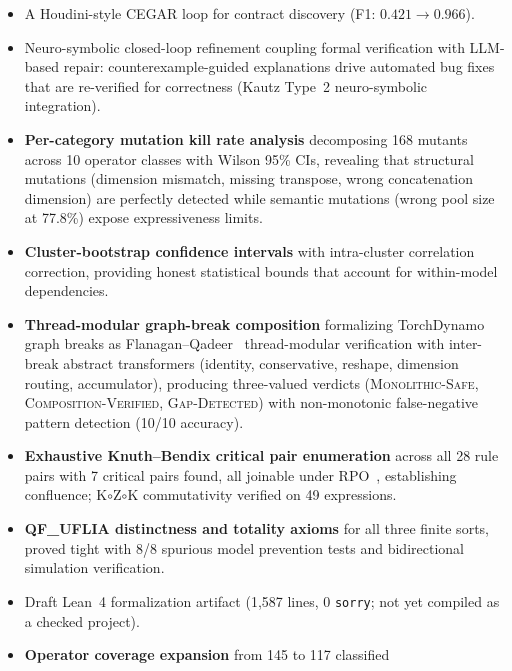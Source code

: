 \documentclass[11pt]{article}
\begin{document}
\begin{itemize}[leftmargin=2em]
    per-layer safety reasoning and counterexample traces, with
    CVC5 native Craig interpolation~\cite{tinelli03} guaranteeing
    all three Craig properties (implication, separation, vocabulary
    restriction) for predicate discovery.
  \item A Houdini-style CEGAR loop for contract discovery
    (F1: $0.421 \to 0.966$).
  \item Neuro-symbolic closed-loop refinement coupling formal
    verification with LLM-based repair: counterexample-guided
    explanations drive automated bug fixes that are re-verified
    for correctness (Kautz Type~2 neuro-symbolic integration).
  \item \textbf{Per-category mutation kill rate analysis} decomposing
    168 mutants across 10 operator classes with Wilson 95\% CIs,
    revealing that structural mutations (dimension mismatch, missing
    transpose, wrong concatenation dimension) are perfectly detected while semantic mutations
    (wrong pool size at 77.8\%) expose expressiveness limits.
  \item \textbf{Cluster-bootstrap confidence intervals} with
    intra-cluster correlation correction, providing honest
    statistical bounds that account for within-model dependencies.
  \item \textbf{Thread-modular graph-break composition} formalizing
    TorchDynamo graph breaks as Flanagan--Qadeer~\cite{flanagan03}
    thread-modular verification with inter-break abstract transformers
    (identity, conservative, reshape, dimension routing, accumulator),
    producing three-valued verdicts (\textsc{Monolithic-Safe},
    \textsc{Composition-Verified}, \textsc{Gap-Detected}) with
    non-monotonic false-negative pattern detection (10/10 accuracy).
  \item \textbf{Exhaustive Knuth--Bendix critical pair enumeration}
    across all 28 rule pairs with 7 critical pairs found, all joinable
    under RPO~\cite{dershowitz82}, establishing confluence; K$\circ$Z$\circ$K
    commutativity verified on 49 expressions.
  \item \textbf{QF\_UFLIA distinctness and totality axioms} for all
    three finite sorts, proved tight with 8/8 spurious model
    prevention tests and bidirectional simulation verification.
  \item Draft Lean~4 formalization artifact (1,587 lines, 0
    \texttt{sorry}; not yet compiled as a checked project).
  \item \textbf{Operator coverage expansion} from 145 to 117 classified

\end{itemize}
\end{document}
